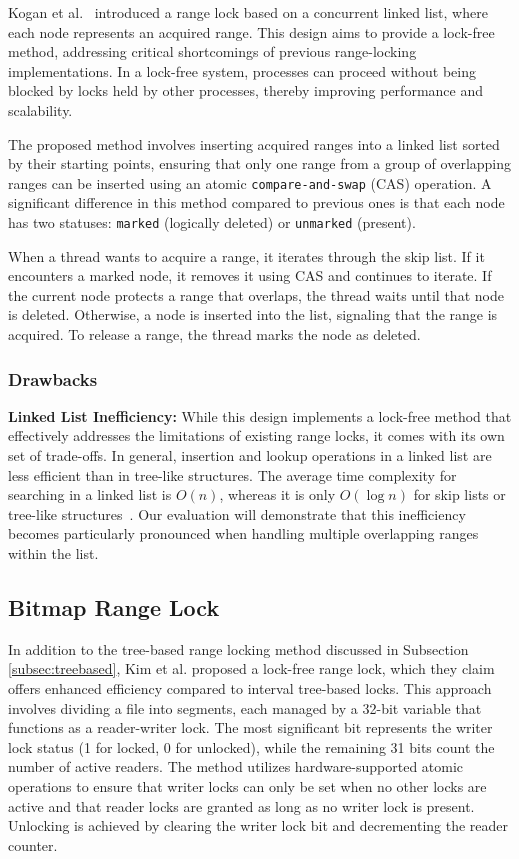 Kogan et al.~\parencite{kogan2020scalable} introduced a range lock based on a concurrent linked list, where each node represents an acquired range. This design aims to provide a lock-free method, addressing critical shortcomings of previous range-locking implementations. In a lock-free system, processes can proceed without being blocked by locks held by other processes, thereby improving performance and scalability.

The proposed method involves inserting acquired ranges into a linked list sorted by their starting points, ensuring that only one range from a group of overlapping ranges can be inserted using an atomic \texttt{compare-and-swap} (CAS) operation. A significant difference in this method compared to previous ones is that each node has two statuses: \texttt{marked} (logically deleted) or \texttt{unmarked} (present).

When a thread wants to acquire a range, it iterates through the skip list. If it encounters a marked node, it removes it using CAS and continues to iterate. If the current node protects a range that overlaps, the thread waits until that node is deleted. Otherwise, a node is inserted into the list, signaling that the range is acquired. To release a range, the thread marks the node as deleted.

\subsubsection*{Drawbacks}

\textbf{Linked List Inefficiency:} While this design implements a lock-free method that effectively addresses the limitations of existing range locks, it comes with its own set of trade-offs. In general, insertion and lookup operations in a linked list are less efficient than in tree-like structures. The average time complexity for searching in a linked list is \( O(n) \), whereas it is only \( O(\log n) \) for skip lists or tree-like structures~\parencite{fomitchev2004lock}. Our evaluation will demonstrate that this inefficiency becomes particularly pronounced when handling multiple overlapping ranges within the list.

\subsection{Bitmap Range Lock}

In addition to the tree-based range locking method discussed in Subsection \ref{subsec:treebased}, Kim et al. proposed a lock-free range lock, which they claim offers enhanced efficiency compared to interval tree-based locks. 
This approach involves dividing a file into segments, each managed by a 32-bit variable that functions as a reader-writer lock. The most significant bit represents the writer lock status (1 for locked, 0 for unlocked), while the remaining 31 bits count the number of active readers. 
The method utilizes hardware-supported atomic operations to ensure that writer locks can only be set when no other locks are active and that reader locks are granted as long as no writer lock is present. 
Unlocking is achieved by clearing the writer lock bit and decrementing the reader counter. 

